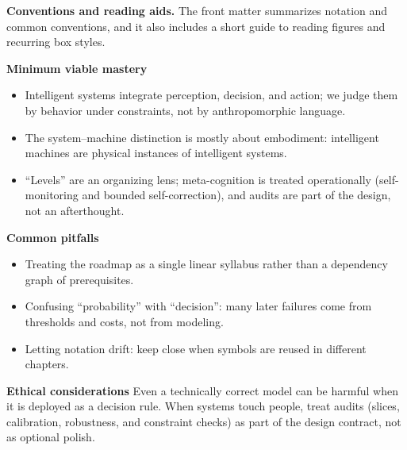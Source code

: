 \noindent\textbf{Conventions and reading aids.} The front matter summarizes notation and common conventions, and it also includes a short guide to reading figures and recurring box styles.

\medskip
\begin{tcolorbox}[summarybox, title={Key takeaways}]
\textbf{Minimum viable mastery}
\begin{itemize}
    \item Intelligent systems integrate perception, decision, and action; we judge them by behavior under constraints, not by anthropomorphic language.
    \item The system--machine distinction is mostly about embodiment: intelligent machines are physical instances of intelligent systems.
    \item ``Levels'' are an organizing lens; meta\hyp{}cognition is treated operationally (self\hyp{}monitoring and bounded self\hyp{}correction), and audits are part of the design, not an afterthought.
\end{itemize}
\medskip
\textbf{Common pitfalls}
\begin{itemize}
    \item Treating the roadmap as a single linear syllabus rather than a dependency graph of prerequisites.
    \item Confusing ``probability'' with ``decision'': many later failures come from thresholds and costs, not from modeling.
    \item Letting notation drift: keep  close when symbols are reused in different chapters.
\end{itemize}
\medskip
\textbf{Ethical considerations}
Even a technically correct model can be harmful when it is deployed as a decision rule. When systems touch people, treat audits (slices, calibration, robustness, and constraint checks) as part of the design contract, not as optional polish.
\end{tcolorbox}

